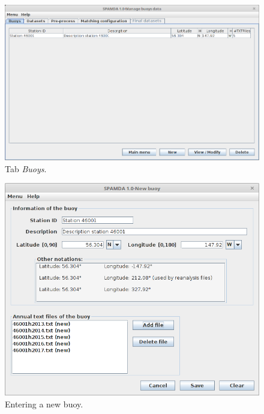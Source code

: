 \begin{onehalfspace}
			\begin{figure}[ht!]
				\centering
				\includegraphics[scale=0.40]{figures/tabBuoys_CS.png}
				\caption{Tab \textit{Buoys}.}\label{fig:manage_buoys}
			\end{figure}

			\begin{figure}[ht!]
				\centering
				\includegraphics[scale=0.40]{figures/enteringBuoy_CS.png}
				\caption{Entering a new buoy.}\label{fig:entering_buoy}
			\end{figure}

			

\end{onehalfspace}
